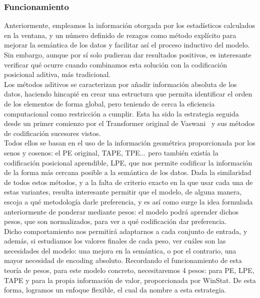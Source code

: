 \subsubsection{Funcionamiento}

Anteriormente, empleamos la información otorgada por los estadísticos calculados en la ventana, y un número definido de rezagos como método explícito para mejorar la semántica de los datos y facilitar así el proceso inductivo del modelo. Sin embargo, aunque por sí solo pudieran dar resultados positivos, es interesante verificar qué ocurre cuando combinamos esta solución con la codificación posicional aditiva, más tradicional.\\

Los métodos aditivos se caracterizan por añadir información absoluta de los datos, haciendo hincapié en crear una estructura que permita identificar el orden de los elementos de forma global, pero teniendo de cerca la eficiencia computacional como restricción a cumplir. Esta ha sido la estrategia seguida desde un primer comienzo por el Transformer original de Vaswani~\cite{vaswani2023attentionneed} y sus métodos de codificación sucesores vistos.\\

Todos ellos se basan en el uso de la información geométrica proporcionada por los senos y cosenos: el PE original, TAPE, TPE... pero también existía la codificación posicional aprendible, LPE, que nos permite codificar la información de la forma más cercana posible a la semántica de los datos. Dada la similaridad de todos estos métodos, y a la falta de criterio exacto en la que usar cada una de estas variantes, resulta interesante permitir que el modelo, de alguna manera, escoja a qué metodología darle preferencia, y es así como surge la idea formulada anteriormente de ponderar mediante pesos: el modelo podrá aprender dichos pesos, que son normalizados, para ver a qué codificación dar preferencia.\\

Dicho comportamiento nos permitirá adaptarnos a cada conjunto de entrada, y además, si estudiamos los valores finales de cada peso, ver cuáles son las necesidades del modelo: una mejora en la semántica, o por el contrario, una mayor necesidad de encoding absoluto. Recordando el funcionamiento de esta teoría de pesos, para este modelo concreto, necesitaremos 4 pesos: para PE, LPE, TAPE y para la propia información de valor, proporcionada por WinStat. De esta forma, logramos un enfoque flexible, el cual da nombre a esta estrategia.\\

